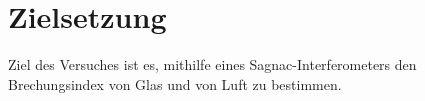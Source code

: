 
\section{Zielsetzung}
\label{sec:Zielsetzung}
Ziel des Versuches ist es, mithilfe eines Sagnac-Interferometers den Brechungsindex von Glas und von Luft zu bestimmen.